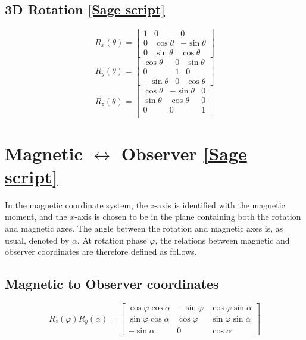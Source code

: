 \documentclass{book}
\newcommand{\phase}{\varphi}
\newcommand{\linktosage}[1]{\hyperref[#1]{[Sage script]}}
\begin{document}
\subsection{3D Rotation \linktosage{sage:3Drotation}}

\begin{equation}
    R_x(\theta) = \begin{bmatrix}
        1 & 0 & 0 \\
        0 & \cos\theta & -\sin\theta \\
        0 & \sin\theta & \cos\theta
    \end{bmatrix}
\end{equation}
\begin{equation}
    R_y(\theta) = \begin{bmatrix}
        \cos\theta & 0 & \sin\theta \\
        0 & 1 & 0 \\
        -\sin\theta & 0 & \cos\theta
    \end{bmatrix}
\end{equation}
\begin{equation}
    R_z(\theta) = \begin{bmatrix}
        \cos\theta & -\sin\theta & 0 \\
        \sin\theta & \cos\theta & 0 \\
        0 & 0 & 1 \\
    \end{bmatrix}
\end{equation}

\section{Magnetic $\leftrightarrow$ Observer \linktosage{sage:mag2obs}}

In the magnetic coordinate system, the $z$-axis is identified with the magnetic moment, and the $x$-axis is chosen to be in the plane containing both the rotation and magnetic axes.
The angle between the rotation and magnetic axes is, as usual, denoted by $\alpha$.
At rotation phase $\phase$, the relations between magnetic and observer coordinates are therefore defined as follows.

\subsection{Magnetic to Observer coordinates}
\begin{equation}
    R_z(\phase) R_y(\alpha) =
    \begin{bmatrix}
        \cos\phase\cos\alpha & -\sin\phase & \cos\phase\sin\alpha \\
        \sin\phase\cos\alpha &  \cos\phase & \sin\phase\sin\alpha \\
        -\sin\alpha          & 0           & \cos\alpha
    \end{bmatrix}
\end{equation}
\end{document}
